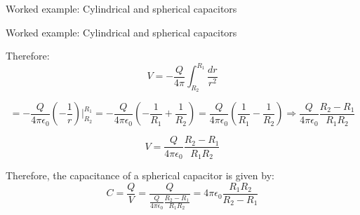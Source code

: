 {\begin{frame}{Worked example: Cylindrical and spherical capacitors}
\end{frame}

%
%
%

\begin{frame}{Worked example: Cylindrical and spherical capacitors}

  Therefore:
  \begin{equation*}
      V = - \frac{Q}{4\pi} \int_{R_2}^{R_1}  \frac{dr}{r^2}
  \end{equation*}

  \begin{equation*}
        =   - \frac{Q}{4\pi \epsilon_0}  (-\frac{1}{r}) \rvert_{R_2}^{R_1} =
            - \frac{Q}{4\pi \epsilon_0}  (-\frac{1}{R_1} + \frac{1}{R_2}) =
            \frac{Q}{4\pi \epsilon_0}   (\frac{1}{R_1} - \frac{1}{R_2}) \Rightarrow
            \frac{Q}{4\pi \epsilon_0} \frac{R_2-R_1}{R_1 R_2}
  \end{equation*}

  \begin{equation*}
        V = \frac{Q}{4\pi \epsilon_0} \frac{R_2-R_1}{R_1 R_2}
  \end{equation*}

  Therefore, the capacitance of a spherical capacitor is given by:
  \begin{equation*}
      C = \frac{Q}{V} = \frac{Q}{\frac{Q}{4\pi \epsilon_0} \frac{R_2-R_1}{R_1 R_2}} =
             4\pi \epsilon_0 \frac{R_1 R_2}{R_2-R_1}
  \end{equation*}

\end{frame}

} %


%
%

